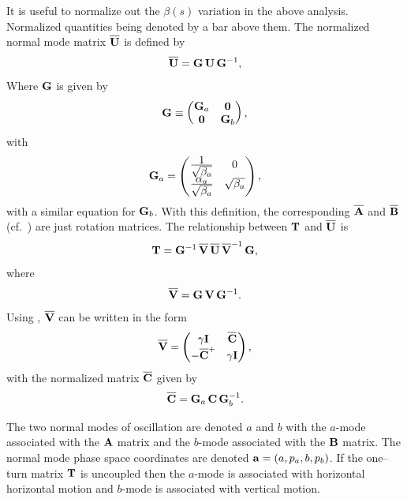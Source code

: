 It is useful to normalize out the $\beta(s)$ variation in the above analysis. Normalized quantities
being denoted by a bar above them. The normalized normal mode matrix $\BAR\bfU$ is defined by
  \begin{equation}
    \BAR\bfU = \bfG \, \bfU \, \bfG\inv
    , \label{ugug}
  \end{equation}
Where ${\bf G}$ is given by 
  \begin{equation}
    {\bf G} \equiv 
    \begin{pmatrix}
      {\bf G}_a & {\bf 0} \cr 
      {\bf 0} & {\bf G}_b
    \end{pmatrix}
    , \label{gg00g}
  \end{equation}  
with 
  \begin{equation}
    {\bf G}_a = 
    \begin{pmatrix}
      \frac{\textstyle 1}{\textstyle \sqrt{\beta_a}} & 0 \cr
      \frac{\textstyle \alpha_a}{\textstyle \sqrt{\beta_a}} & \sqrt{\beta_a}
    \end{pmatrix}
    , \label{g1b0a} 
  \end{equation}
with a similar equation for ${\bf G}_b$. With this definition, the corresponding $\BAR\bfA$ and
$\BAR\bfB$ (cf.~) are just rotation matrices. The relationship between ${\bf T}$ and
$\BAR\bfU$ is
  \begin{equation}
    \bfT = \bfG\inv \, \BAR\bfV \, \BAR\bfU \, \BAR\bfV\inv \, \bfG
    , \label{tgvuv}
  \end{equation}
where
  \begin{equation}
    \BAR\bfV = \bfG \, \bfV \, \bfG\inv
    . \label{vgvg}
  \end{equation}
Using , $\BAR\bfV$ can be written in the form
  \begin{equation}
    \BAR\bfV = 
    \begin{pmatrix}
      \gamma \bfI & \BAR\bfC \cr -\BAR\bfC^+ & \gamma \bfI
    \end{pmatrix}
    , \label{vgicc3}
  \end{equation}
with the normalized matrix $\BAR\bfC$ given by
  \begin{equation}
    \BAR\bfC = \bfG_a \, \bfC \, \bfG_b\inv
    . \label{cgcg}
  \end{equation}

The two normal modes of oscillation are denoted $a$ and $b$ with the $a$-mode associated with the
${\bf A}$ matrix and the $b$-mode associated with the ${\bf B}$ matrix. The normal mode phase space
coordinates are denoted ${\bf a} = (a, p_a, b, p_b)$. If the one--turn matrix ${\bf T}$ is uncoupled
then the $a$-mode is associated with horizontal horizontal motion and $b$-mode is associated with
vertical motion.

